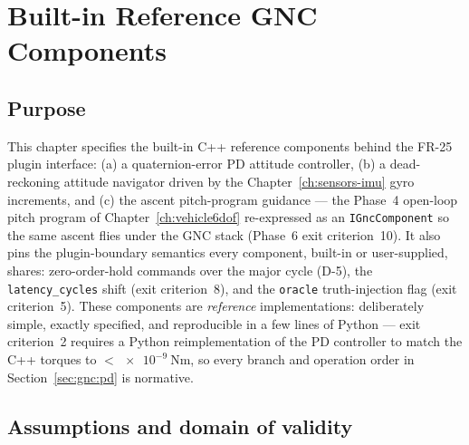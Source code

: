 \chapter{Built-in Reference GNC Components}
\label{ch:gnc-builtin}

\section{Purpose}
\label{sec:gnc:purpose}

This chapter specifies the built-in C++ reference components behind the
FR-25 plugin interface: (a) a quaternion-error PD attitude controller,
(b) a dead-reckoning attitude navigator driven by the
Chapter~\ref{ch:sensors-imu} gyro increments, and (c) the ascent
pitch-program guidance --- the Phase~4 open-loop pitch program of
Chapter~\ref{ch:vehicle6dof} re-expressed as an \texttt{IGncComponent}
so the same ascent flies under the GNC stack (Phase~6 exit
criterion~10). It also pins the plugin-boundary semantics every
component, built-in or user-supplied, shares: zero-order-hold commands
over the major cycle (D-5), the \texttt{latency\_cycles} shift (exit
criterion~8), and the \texttt{oracle} truth-injection flag (exit
criterion~5). These components are \emph{reference} implementations:
deliberately simple, exactly specified, and reproducible in a few lines
of Python --- exit criterion~2 requires a Python reimplementation of the
PD controller to match the C++ torques to
$< \qty{e-9}{\newton\metre}$, so every branch and operation order in
Section~\ref{sec:gnc:pd} is normative.

\section{Assumptions and domain of validity}
\label{sec:gnc:domain}

